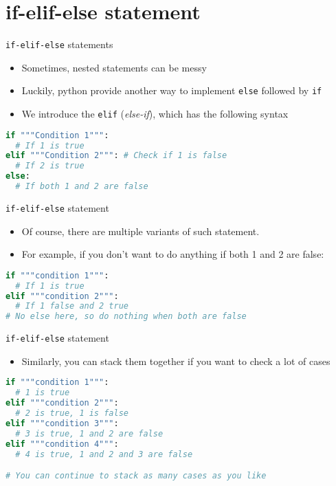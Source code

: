 \documentclass[10pt,xcolor={table,dvipsnames},t]{beamer}
\begin{document}
\section{if-elif-else statement}
\begin{frame}[fragile]{\texttt{if-elif-else} statements}
  \begin{itemize}
    \item Sometimes, nested statements can be messy
    \item Luckily, python provide another way to implement \texttt{else} followed by \texttt{if}
    \item We introduce the \texttt{elif} (\textit{else-if}), which has the following syntax
  \end{itemize}
\begin{lstlisting}[language=python]
if """Condition 1""":
  # If 1 is true
elif """Condition 2""": # Check if 1 is false 
  # If 2 is true
else:
  # If both 1 and 2 are false
\end{lstlisting}
\end{frame}

\begin{frame}[fragile]{\texttt{if-elif-else} statement}
  \begin{itemize}
    \item Of course, there are multiple variants of such statement. 
    \item For example, if you don't want to do anything if both 1 and 2 are false:
  \end{itemize}
\begin{lstlisting}[language=python]
if """condition 1""":
  # If 1 is true 
elif """condition 2""":
  # If 1 false and 2 true
# No else here, so do nothing when both are false
\end{lstlisting}
\end{frame}

\begin{frame}[fragile]{\texttt{if-elif-else} statement}
  \begin{itemize}
    \item Similarly, you can stack them together if you want to check a lot of cases
  \end{itemize}
\begin{lstlisting}[language=python]
if """condition 1""":
  # 1 is true
elif """condition 2""":
  # 2 is true, 1 is false
elif """condition 3""":
  # 3 is true, 1 and 2 are false
elif """condition 4""":
  # 4 is true, 1 and 2 and 3 are false 

# You can continue to stack as many cases as you like
\end{lstlisting}
\end{frame}
\end{document}
